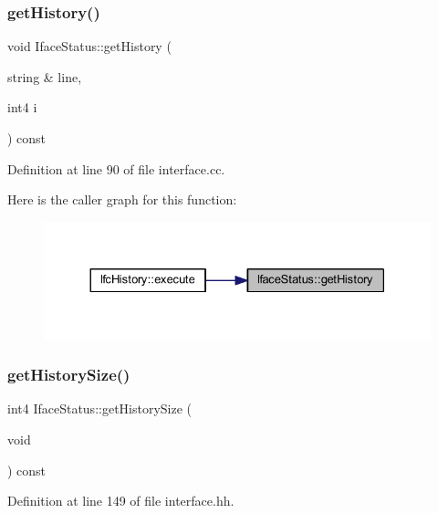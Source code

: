 \subsubsection{\texorpdfstring{getHistory()}{getHistory()}}
{\footnotesize\ttfamily void Iface\+Status\+::get\+History (\begin{DoxyParamCaption}\item[{string \&}]{line,  }\item[{int4}]{i }\end{DoxyParamCaption}) const}



Definition at line 90 of file interface.\+cc.

Here is the caller graph for this function\+:
\nopagebreak
\begin{figure}[H]
\begin{center}
\leavevmode
\includegraphics[width=330pt]{class_iface_status_a2ee164e918fff2ea7901fffa1fb6ad9b_icgraph}
\end{center}
\end{figure}
\mbox{\label{class_iface_status_aaf46b06f2ddb74f7e59ab6c13c9ce3db}} 
\subsubsection{\texorpdfstring{getHistorySize()}{getHistorySize()}}
{\footnotesize\ttfamily int4 Iface\+Status\+::get\+History\+Size (\begin{DoxyParamCaption}\item[{void}]{ }\end{DoxyParamCaption}) const\hspace{0.3cm}{\ttfamily [inline]}}



Definition at line 149 of file interface.\+hh.

